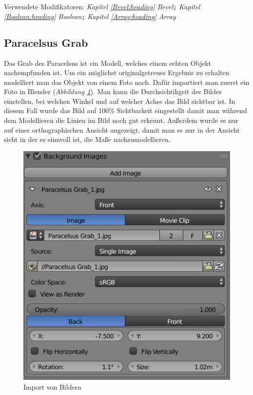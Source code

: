 Verwendete Modifikatoren: \textit{Kapitel \ref{Bevel:heading} \dq Bevel\dq}\verb+;+ \textit{Kapitel \ref{Boolean:heading} \dq Boolean\dq}\verb+;+ \textit{Kapitel \ref{Array:heading} \dq Array\dq}

\subsection{Paracelsus Grab}
\label{paracelsusgrab:ref1}
Das Grab des Paracelsus ist ein Modell, welches einem echten Objekt nachempfunden ist. Um ein möglichst originalgetreues Ergebnis zu erhalten
modelliert man das Objekt von einem Foto nach. Dafür importiert man zuerst ein Foto in Blender (\textit{Abbildung \ref{Paracelsus_Grab:image1}}).
Man kann die Durchsichtikgeit des Bildes einstellen, bei welchen Winkel und auf welcher Achse das Bild sichtbar ist.
In diesem Fall wurde das Bild auf 100\% Sichtbarkeit eingestellt damit man während dem Modellieren die Linien im Bild noch gut erkennt.
Außerdem wurde es nur auf einer orthographischen Ansicht angezeigt, damit man es nur in der Ansicht sieht in der es sinnvoll ist, die Maße nachzumodellieren.

\raggedbottom
\begin{figure}[H]
    \centering
    \includegraphics[width=.8\textwidth]{images/Paracelsus-Grab_Import-von-Bildern.png}
    \caption{Import von Bildern}
    \label{Paracelsus_Grab:image1}
\end{figure}

